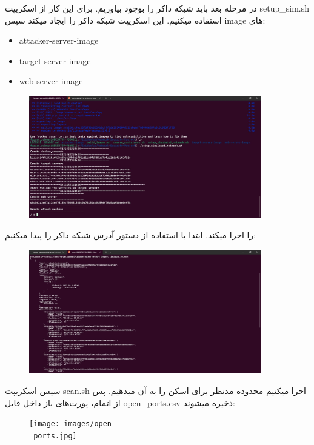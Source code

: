 \documentclass{article}
\begin{document}
 در مرحله بعد باید شبکه داکر را بوجود بیاوریم. برای این کار از اسکریپت setup\_sim.sh استفاده میکنیم. این اسکریپت شبکه داکر را ایجاد میکند سپس image های:
\begin{itemize}
\item attacker-server-image
\item target-server-image
\item web-server-image
\end{itemize} 
\begin{figure}[ht]
\centering
\includegraphics[width=0.9\textwidth]{images/setup.jpg}
\end{figure}
را اجرا میکند. 
\newpage
ابتدا با استفاده از دستور  آدرس شبکه داکر را پیدا میکنیم:
\begin{figure}[ht]
\centering
\includegraphics[width=0.9\textwidth]{images/inspect.jpg}
\end{figure}
\newpage
سپس اسکریپت scan.sh اجرا میکنیم محدوده مدنظر برای اسکن را به آن میدهیم. پس از اتمام، پورت‌های باز داخل فایل open\_ports.csv ذخیره میشوند: 
\begin{figure}[h]
\centering
\texttt{[image: images/open\\\_ports.jpg]}
\end{figure}
\end{document}
